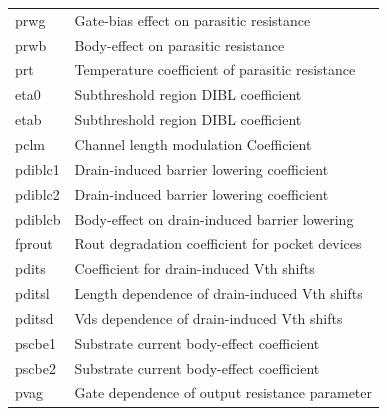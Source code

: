 \begin{longtable}{l l}
{\small prwg} & {\small Gate-bias effect on parasitic resistance } \\    
{\small prwb} & {\small Body-effect on parasitic resistance } \\    

{\small prt} & {\small Temperature coefficient of parasitic resistance } \\    
{\small eta0} & {\small Subthreshold region DIBL coefficient} \\
{\small etab} & {\small Subthreshold region DIBL coefficient} \\
{\small pclm} & {\small Channel length modulation Coefficient} \\
{\small pdiblc1} & {\small Drain-induced barrier lowering coefficient} \\   
{\small pdiblc2} & {\small Drain-induced barrier lowering coefficient} \\   
{\small pdiblcb} & {\small Body-effect on drain-induced barrier lowering} \\   
{\small fprout} & {\small Rout degradation coefficient for pocket devices} \\
{\small pdits} & {\small Coefficient for drain-induced Vth shifts} \\
{\small pditsl} & {\small Length dependence of drain-induced Vth shifts} \\
{\small pditsd} & {\small Vds dependence of drain-induced Vth shifts} \\
{\small pscbe1} & {\small Substrate current body-effect coefficient} \\   
{\small pscbe2} & {\small Substrate current body-effect coefficient} \\   
{\small pvag} & {\small Gate dependence of output resistance parameter} \\   


\end{longtable}
